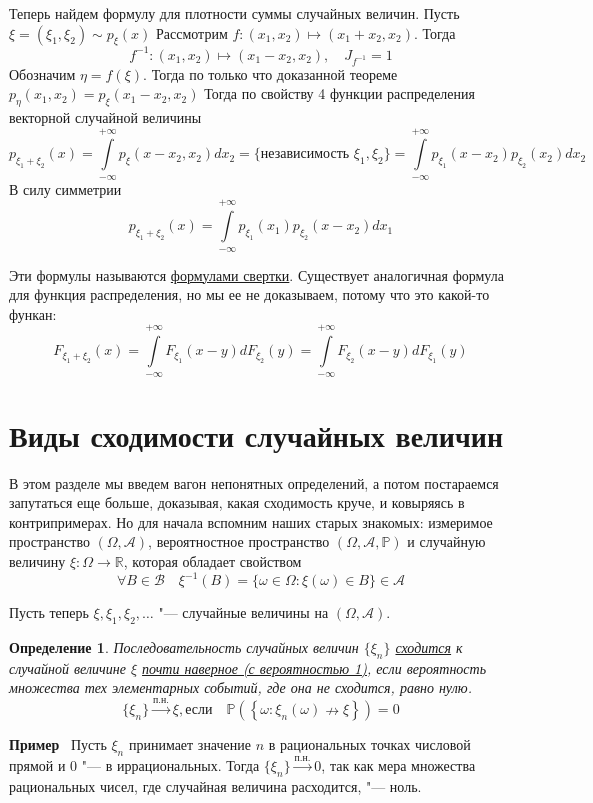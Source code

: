 \documentclass[12pt]{article}
\newtheorem{Def}{Определение}
\newenvironment{Ex}{{\bf Пример}\ }{}
\numberwithin{Th}{section}
\numberwithin{Def}{section}
\numberwithin{Lem}{section}
\numberwithin{St}{section}
\numberwithin{equation}{section}
\newcommand\Set[2]{\left\{ #1 \colon #2 \right\}}
\newcommand\Pro{\mathbb{P}} %
\newcommand\Ev{\mathscr{A}} %
\newcommand\Bor{\mathscr{B}} %
\newcommand\Real{\mathbb{R}} %
\begin{document}
Теперь найдем формулу для плотности суммы случайных величин.
Пусть $\xi = (\xi_1, \xi_2) \sim p_\xi(x)$
Рассмотрим $f\colon (x_1, x_2) \mapsto (x_1 + x_2, x_2)$. Тогда $$f^{-1} \colon (x_1, x_2) \mapsto (x_1 - x_2, x_2), \quad J_{f^{-1}}=1$$
Обозначим $\eta = f(\xi)$. Тогда по только что доказанной теореме 
$p_\eta(x_1, x_2) = p_{\xi}(x_1 - x_2, x_2)$
Тогда по свойству 4 функции распределения векторной случайной величины
$$p_{\xi_1 + \xi_2}(x) = \int\limits_{-\infty}^{+\infty}p_\xi(x-x_2, x_2)dx_2 = \text{\{независимость $\xi_1, \xi_2$\}} = \int\limits_{-\infty}^{+\infty}p_{\xi_1}(x-x_2)p_{\xi_2}(x_2)dx_2$$
В силу симметрии 
$$p_{\xi_1 + \xi_2}(x) = \int\limits_{-\infty}^{+\infty}p_{\xi_1}(x_1)p_{\xi_2}(x - x_2)dx_1$$

Эти формулы называются \underline{формулами свертки}. Существует аналогичная формула для функция распределения, но мы ее не доказываем, потому что это какой-то функан:
$$F_{\xi_1 + \xi_2}(x) = \int\limits_{-\infty}^{+\infty}F_{\xi_1}(x-y)dF_{\xi_2}(y) = \int\limits_{-\infty}^{+\infty}F_{\xi_2}(x-y)dF_{\xi_1}(y)$$

\newpage
\section{Виды сходимости случайных величин}

В этом разделе мы введем вагон непонятных определений, а потом постараемся запутаться еще больше, доказывая, какая сходимость круче, и ковыряясь в контрипримерах. Но для начала вспомним наших старых знакомых: измеримое пространство $(\Omega, \Ev)$, вероятностное пространство $(\Omega, \Ev, \Pro)$ и случайную величину $\xi \colon \Omega \rightarrow \Real$, которая обладает свойством
$$\forall B \in \Bor \quad \xi^{-1}(B) = \{ \omega \in \Omega \colon \xi(\omega) \in B \} \in \Ev$$

Пусть теперь $\xi, \xi_1, \xi_2, \dots$ "--- случайные величины на $(\Omega, \Ev)$.

\begin{Def}
Последовательность случайных величин $\{\xi_n\}$ \uline{сходится} к случайной величине $\xi$ \uline{почти наверное (с вероятностью 1)}, если вероятность множества тех элементарных событий, где она не сходится, равно нулю.
$$\{ \xi_n \} \xrightarrow{\text{п.н.}} \xi, \text{если} \quad \Pro(\Set{\omega}{\xi_n(\omega) \nrightarrow \xi}) = 0$$
\end{Def}

\begin{Ex}
Пусть $\xi_n$ принимает значение $n$ в рациональных точках числовой прямой и $0$ "--- в иррациональных. Тогда $\{\xi_n\} \xrightarrow{\text{п.н.}} 0$, так как мера множества рациональных чисел, где случайная величина расходится, "--- ноль.
\end{Ex}
\end{document}

